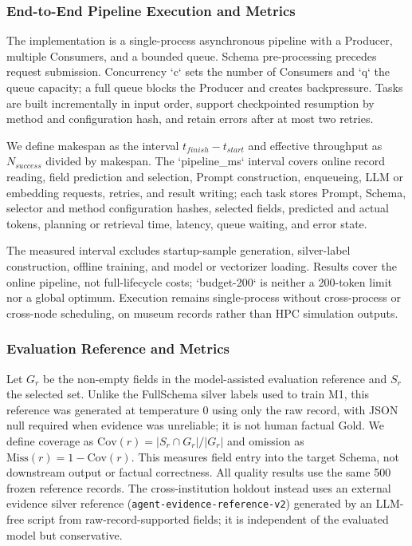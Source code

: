 \documentclass[runningheads]{llncs}
\newcommand{\full}{FullSchema}
\begin{document}
\subsubsection{End-to-End Pipeline Execution and Metrics}

The implementation is a single-process asynchronous pipeline with a Producer, multiple Consumers, and a bounded queue. Schema pre-processing precedes request submission. Concurrency `c` sets the number of Consumers and `q` the queue capacity; a full queue blocks the Producer and creates backpressure. Tasks are built incrementally in input order, support checkpointed resumption by method and configuration hash, and retain errors after at most two retries.

We define makespan as the interval $t_{finish}-t_{start}$ and effective throughput as $N_{success}$ divided by makespan. The `pipeline_ms` interval covers online record reading, field prediction and selection, Prompt construction, enqueueing, LLM or embedding requests, retries, and result writing; each task stores Prompt, Schema, selector and method configuration hashes, selected fields, predicted and actual tokens, planning or retrieval time, latency, queue waiting, and error state.

The measured interval excludes startup-sample generation, silver-label construction, offline training, and model or vectorizer loading. Results cover the online pipeline, not full-lifecycle costs; `budget-200` is neither a 200-token limit nor a global optimum. Execution remains single-process without cross-process or cross-node scheduling, on museum records rather than HPC simulation outputs.

\subsubsection{Evaluation Reference and Metrics}

 Let $G_r$ be the non-empty fields in the model-assisted evaluation reference and $S_r$ the selected set. Unlike the \full{} silver labels used to train M1, this reference was generated at temperature 0 using only the raw record, with JSON null required when evidence was unreliable; it is not human factual Gold. We define coverage as $\mathrm{Cov}(r)=|S_r\cap G_r|/|G_r|$ and omission as $\mathrm{Miss}(r)=1-\mathrm{Cov}(r)$. This measures field entry into the target Schema, not downstream output or factual correctness. All quality results use the same 500 frozen reference records. The cross-institution holdout instead uses an external evidence silver reference (\texttt{agent-evidence-reference-v2}) generated by an LLM-free script from raw-record-supported fields; it is independent of the evaluated model but conservative.
\end{document}
